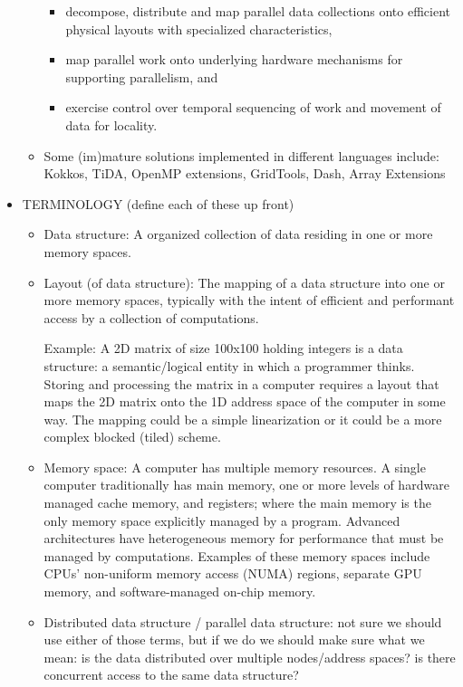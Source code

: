 \begin{itemize}
\begin{itemize}
    \begin{itemize}
    \item decompose, distribute and map parallel data collections onto efficient physical layouts with specialized characteristics, 
    \item map parallel work onto underlying hardware mechanisms for supporting parallelism, and 
    \item exercise control over temporal sequencing of work and movement of data for locality.
    \end{itemize}
  \item Some (im)mature solutions implemented in different languages include: Kokkos, TiDA, OpenMP extensions, GridTools, Dash, Array Extensions
\end{itemize}


\item TERMINOLOGY (define each of these up front)
  \begin{itemize}

 \item Data structure: A organized collection of data residing in one or more memory spaces. 

  \item Layout (of data structure):
    The mapping of a data structure into one or more memory spaces, typically with the intent of efficient and performant access by a collection of computations.

    Example: A 2D matrix of size 100x100 holding integers is a data structure: a semantic/logical entity in which a programmer thinks. Storing and processing the matrix in a computer requires a layout that maps the 2D matrix onto the 1D address space of the computer in some way. The mapping could be a simple linearization or it could be a more complex blocked (tiled) scheme.

  \item Memory space: A computer has multiple memory resources.  A single computer traditionally has main memory, one or more levels of hardware managed cache memory, and registers; where the main memory is the only memory space explicitly managed by a program.  Advanced architectures have heterogeneous memory for performance that must be managed by computations.  Examples of these memory spaces include CPUs' non-uniform memory access (NUMA) regions, separate GPU memory, and software-managed on-chip memory.

 
  \item Distributed data structure / parallel data structure: not sure we should use either of those terms, but if we do we should make sure what we mean: is the data distributed over multiple nodes/address spaces? is there concurrent access to the same data structure? 
      

\end{itemize}
\end{itemize}
